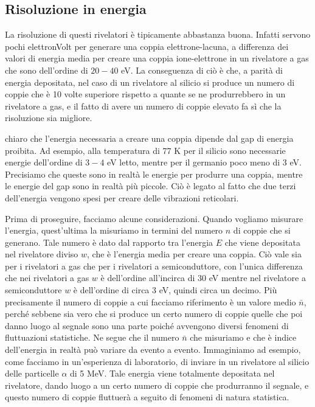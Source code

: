\subsection{Risoluzione in energia}
La risoluzione di questi rivelatori è tipicamente abbastanza buona. Infatti servono pochi elettronVolt per generare una coppia elettrone-lacuna, a differenza dei valori di energia media per creare una coppia ione-elettrone in un rivelatore a gas che sono dell'ordine di $20-40$ eV. La conseguenza di ciò è che, a parità di energia depositata, nel caso di un rivelatore al silicio si produce un numero di coppie che è 10 volte superiore rispetto a quante se ne produrrebbero in un rivelatore a gas, e il fatto di avere un numero di coppie elevato fa sì che la risoluzione sia migliore.

\E chiaro che l'energia necessaria a creare una coppia dipende dal gap di energia proibita. Ad esempio, alla temperatura di 77 K per il silicio sono necessarie energie dell'ordine di $3-4$ eV letto, mentre per il germanio poco meno di 3 eV. Precisiamo che queste sono in realtà le energie per produrre una coppia, mentre le energie del gap sono in realtà più piccole. Ciò è legato al fatto che due terzi dell'energia vengono spesi per creare delle vibrazioni reticolari.

Prima di proseguire, facciamo alcune considerazioni. Quando vogliamo misurare l'energia, quest'ultima la misuriamo in termini del numero $n$ di coppie che si generano. Tale numero è dato dal rapporto tra l'energia $E$ che viene depositata nel rivelatore diviso $w$, che è l'energia media per creare una coppia. Ciò vale sia per i rivelatori a gas che per i rivelatori a semiconduttore, con l'unica differenza che nei rivelatori a gas $w$ è dell'ordine all'incirca di 30 eV mentre nel rivelatore a semiconduttore $w$ è dell'ordine di circa 3 eV, quindi circa un decimo. Più precisamente il numero di coppie a cui facciamo riferimento è un valore medio $\bar{n}$, perché sebbene sia vero che si produce un certo numero di coppie quelle che poi danno luogo al segnale sono una parte poiché avvengono diversi fenomeni di fluttuazioni statistiche. Ne segue che il numero $\bar{n}$ che misuriamo e che è indice dell'energia in realtà può variare da evento a evento. Immaginiamo ad esempio, come facciamo in un'esperienza di laboratorio, di inviare in un rivelatore al silicio delle particelle $\alpha$ di 5 MeV. Tale energia viene totalmente depositata nel rivelatore, dando luogo a un certo numero di coppie che produrranno il segnale, e questo numero di coppie fluttuerà a seguito di fenomeni di natura statistica.

